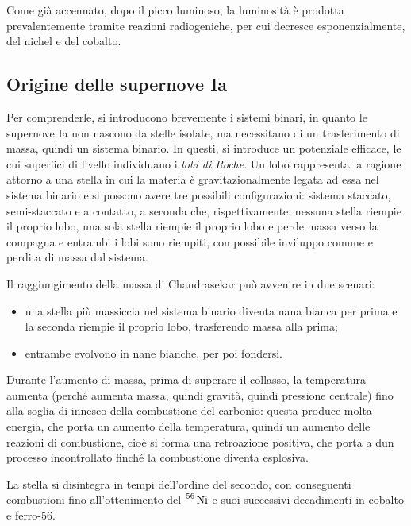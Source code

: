 \documentclass[11pt, a4paper]{scrartcl}
\theoremstyle{style}
\theoremstyle{style1}
\numberwithin{equation}{subsection}
\begin{document}
Come gi\`a accennato, dopo il picco luminoso, la luminosit\`a \`e prodotta prevalentemente tramite reazioni radiogeniche, per cui decresce esponenzialmente, del nichel e del cobalto.

\subsection{Origine delle supernove Ia}
Per comprenderle, si introducono brevemente i sistemi binari, in quanto le supernove Ia non nascono da stelle isolate, ma necessitano di un trasferimento di massa, quindi un sistema binario.
In questi, si introduce un potenziale efficace, le cui superfici di livello individuano i \textit{lobi di Roche}.
Un lobo rappresenta la ragione attorno a una stella in cui la materia \`e gravitazionalmente legata ad essa nel sistema binario e si possono avere tre possibili configurazioni: sistema staccato, semi-staccato e a contatto, a seconda che, rispettivamente, nessuna stella riempie il proprio lobo, una sola stella riempie il proprio lobo e perde massa verso la compagna e entrambi i lobi sono riempiti, con possibile inviluppo comune e perdita di massa dal sistema.

Il raggiungimento della massa di Chandrasekar pu\`o avvenire in due scenari:
\begin{itemize}
	\item una stella pi\`u massiccia nel sistema binario diventa nana bianca per prima e la seconda riempie il proprio lobo, trasferendo massa alla prima;
	\item entrambe evolvono in nane bianche, per poi fondersi.
\end{itemize}
Durante l'aumento di massa, prima di superare il collasso, la temperatura aumenta (perch\'e aumenta massa, quindi gravit\`a, quindi pressione centrale) fino alla soglia di innesco della combustione del carbonio: questa produce molta energia, che porta un aumento della temperatura, quindi un aumento delle reazioni di combustione, cio\`e si forma una retroazione positiva, che porta a dun processo incontrollato finch\'e la combustione diventa esplosiva.

La stella si disintegra in tempi dell'ordine del secondo, con conseguenti combustioni fino all'ottenimento del $\ce{^{56} Ni}$ e suoi successivi decadimenti in cobalto e ferro-56.
\end{document}
